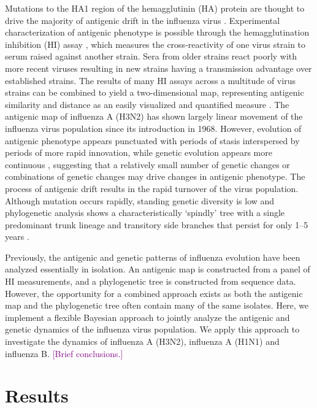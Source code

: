 \documentclass[11pt,oneside,letterpaper]{article}
\def\tbc#1{\textcolor{purple}{[#1]}}
\begin{document}
Mutations to the HA1 region of the hemagglutinin (HA) protein are thought to drive the majority of antigenic drift in the influenza virus \cite{Nelson07NatRevGenet}. 
Experimental characterization of antigenic phenotype is possible through the hemagglutination inhibition (HI) assay \cite{Hirst43}, which measures the cross-reactivity of one virus strain to serum raised against another strain. 
Sera from older strains react poorly with more recent viruses resulting in new strains having a transmission advantage over established strains. 
The results of many HI assays across a multitude of virus strains can be combined to yield a two-dimensional map, representing antigenic similarity and distance as an easily visualized and quantified measure \cite{Smith04}. 
The antigenic map of influenza A (H3N2) has shown largely linear movement of the influenza virus population since its introduction in 1968. However, evolution of antigenic phenotype appears punctuated with periods of stasis interspersed by periods of more rapid innovation, while genetic evolution appears more continuous \cite{Smith04}, suggesting that a relatively small number of genetic changes or combinations of genetic changes may drive changes in antigenic phenotype. 
The process of antigenic drift results in the rapid turnover of the virus population. 
Although mutation occurs rapidly, standing genetic diversity is low and phylogenetic analysis shows a characteristically `spindly' tree with a single predominant trunk lineage and transitory side branches that persist for only 1--5 years \cite{Fitch97}.

Previously, the antigenic and genetic patterns of influenza evolution have been analyzed essentially in isolation. 
An antigenic map is constructed from a panel of HI measurements, and a phylogenetic tree is constructed from sequence data. 
However, the opportunity for a combined approach exists as both the antigenic map and the phylogenetic tree often contain many of the same isolates. 
Here, we implement a flexible Bayesian approach to jointly analyze the antigenic and genetic dynamics of the influenza virus population. 
We apply this approach to investigate the dynamics of influenza A (H3N2), influenza A (H1N1) and influenza B. 
\tbc{Brief conclusions.}

\section*{Results}
\end{document}
